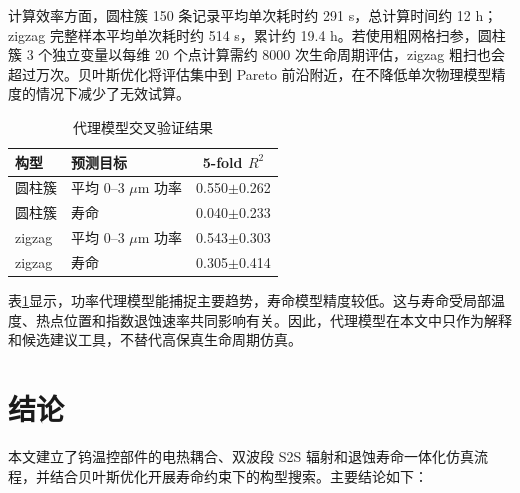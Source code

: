 \documentclass[10pt,twocolumn]{ctexart}
\begin{document}
\begin{table}[!htbp]
\centering
\caption{基线与最优候选性能对比}
\label{tab:perf}
\scriptsize
{}
\end{table}

计算效率方面，圆柱簇 150 条记录平均单次耗时约 291 s，总计算时间约 12 h；zigzag 完整样本平均单次耗时约 514 s，累计约 19.4 h。若使用粗网格扫参，圆柱簇 3 个独立变量以每维 20 个点计算需约 8000 次生命周期评估，zigzag 粗扫也会超过万次。贝叶斯优化将评估集中到 Pareto 前沿附近，在不降低单次物理模型精度的情况下减少了无效试算。

\begin{table}[!htbp]
\centering
\caption{代理模型交叉验证结果}
\label{tab:rf}
\scriptsize
\begin{tabularx}{\columnwidth}{llc}
\toprule
构型 & 预测目标 & 5-fold $R^2$ \\
\midrule
圆柱簇 & 平均 0--3 $\mu$m 功率 & 0.550$\pm$0.262 \\
圆柱簇 & 寿命 & 0.040$\pm$0.233 \\
zigzag & 平均 0--3 $\mu$m 功率 & 0.543$\pm$0.303 \\
zigzag & 寿命 & 0.305$\pm$0.414 \\
\bottomrule
\end{tabularx}
\end{table}

表\ref{tab:rf}显示，功率代理模型能捕捉主要趋势，寿命模型精度较低。这与寿命受局部温度、热点位置和指数退蚀速率共同影响有关。因此，代理模型在本文中只作为解释和候选建议工具，不替代高保真生命周期仿真。

\section{结论}
本文建立了钨温控部件的电热耦合、双波段 S2S 辐射和退蚀寿命一体化仿真流程，并结合贝叶斯优化开展寿命约束下的构型搜索。主要结论如下：
\end{document}
